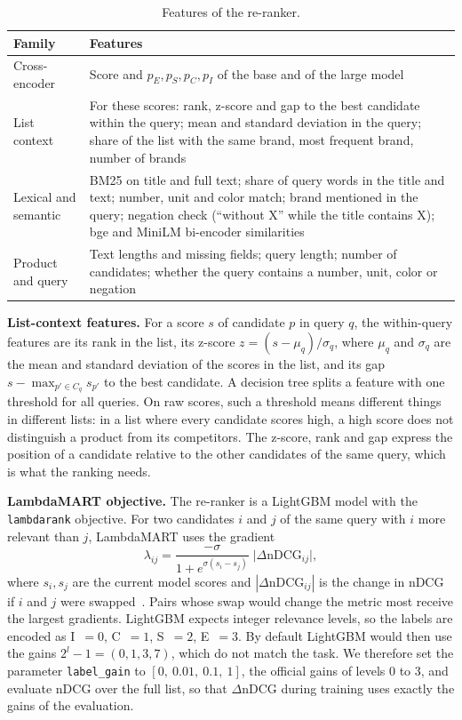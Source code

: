 \documentclass[12pt,a4paper]{report}
\begin{document}
\begin{table}[H]
\centering
\caption{Features of the re-ranker.}
\label{tab:features}
\small
\begin{tabularx}{\textwidth}{@{}l Y@{}}
\toprule
\textbf{Family} & \textbf{Features} \\
\midrule
Cross-encoder & Score and $p_E, p_S, p_C, p_I$ of the base and of the large model \\
List context & For these scores: rank, z-score and gap to the best candidate within the query; mean and standard deviation in the query; share of the list with the same brand, most frequent brand, number of brands \\
Lexical and semantic & BM25 on title and full text; share of query words in the title and text; number, unit and color match; brand mentioned in the query; negation check (``without X'' while the title contains X); bge and MiniLM bi-encoder similarities \\
Product and query & Text lengths and missing fields; query length; number of candidates; whether the query contains a number, unit, color or negation \\
\bottomrule
\end{tabularx}
\end{table}

\textbf{List-context features.} For a score $s$ of candidate $p$ in query $q$, the within-query features are its rank in the list, its z-score $z = (s - \mu_q)/\sigma_q$, where $\mu_q$ and $\sigma_q$ are the mean and standard deviation of the scores in the list, and its gap $s - \max_{p' \in C_q} s_{p'}$ to the best candidate. A decision tree splits a feature with one threshold for all queries. On raw scores, such a threshold means different things in different lists: in a list where every candidate scores high, a high score does not distinguish a product from its competitors. The z-score, rank and gap express the position of a candidate relative to the other candidates of the same query, which is what the ranking needs.

\textbf{LambdaMART objective.} The re-ranker is a LightGBM model with the \texttt{lambdarank} objective. For two candidates $i$ and $j$ of the same query with $i$ more relevant than $j$, LambdaMART uses the gradient
\[
\lambda_{ij} = \frac{-\sigma}{1 + e^{\sigma (s_i - s_j)}}\;\bigl|\Delta\mathrm{nDCG}_{ij}\bigr|,
\]
where $s_i, s_j$ are the current model scores and $|\Delta\mathrm{nDCG}_{ij}|$ is the change in nDCG if $i$ and $j$ were swapped~\cite{lambdamart}. Pairs whose swap would change the metric most receive the largest gradients. LightGBM expects integer relevance levels, so the labels are encoded as I~$=0$, C~$=1$, S~$=2$, E~$=3$. By default LightGBM would then use the gains $2^{l}-1 = (0, 1, 3, 7)$, which do not match the task. We therefore set the parameter \texttt{label\_gain} to $[0,\ 0.01,\ 0.1,\ 1]$, the official gains of levels 0 to 3, and evaluate nDCG over the full list, so that $\Delta\mathrm{nDCG}$ during training uses exactly the gains of the evaluation.
\end{document}
